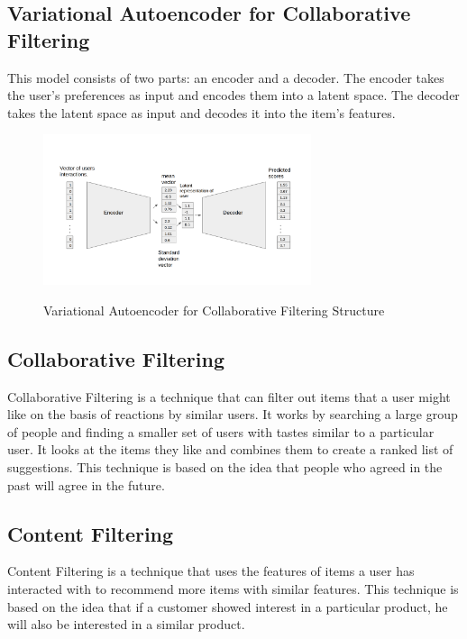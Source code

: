 \subsection{Variational Autoencoder for Collaborative Filtering}
This model consists of two parts: an encoder and a decoder. The encoder takes the user's preferences as input and encodes them into a latent space. The decoder takes the latent space as input and decodes it into the item's features.
\begin{figure}[H]
    \centering
    \includegraphics[width=0.7\textwidth]{assets/variational-autoencoder.png}
    \caption{Variational Autoencoder for Collaborative Filtering Structure}
    \label{fig:variational-autoencoder-for-collaborative-filtering}
    \cite{NvidiaRecSys}
\end{figure}
\subsection{Collaborative Filtering}
Collaborative Filtering is a technique that can filter out items that a user might like on the basis of reactions by similar users. It works by searching a large group of people and finding a smaller set of users with tastes similar to a particular user. It looks at the items they like and combines them to create a ranked list of suggestions. This technique is based on the idea that people who agreed in the past will agree in the future.

\subsection{Content Filtering}
Content Filtering is a technique that uses the features of items a user has interacted with to recommend more items with similar features. This technique is based on the idea that if a customer showed interest in a particular product, he will also be interested in a similar product. \\



